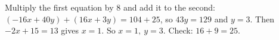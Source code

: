 Multiply the first equation by $8$ and add it to the second: $(-16x+40y)+(16x+3y)=104+25$, so $43y=129$ and $y=3$. Then $-2x+15=13$ gives $x=1$. So $\boxed{x=1,\ y=3}$. Check: $16+9=25$.

